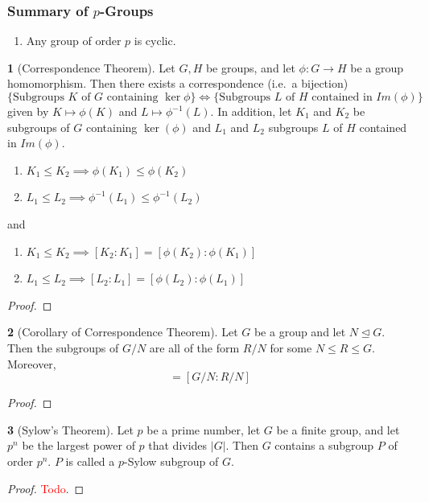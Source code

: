 \documentclass[12pt]{article}
\theoremstyle{definition}
\newtheorem{theorem}{\color{ForestGreen}{\textbf{Theorem}}}
\theoremstyle{definition}
\begin{document}
\subsubsection*{Summary of $p$-Groups}
\begin{enumerate}
	\item Any group of order $p$ is cyclic.
\end{enumerate}

\begin{theorem}[Correspondence Theorem]
	Let $G, H$ be groups, and let $\phi : G \to H$ be a group homomorphism. Then there exists a correspondence (i.e.\ a bijection)
	\begin{equation*}
		\{\text{Subgroups $K$ of $G$ containing $\ker \phi$}\} \iff \{\text{Subgroups $L$ of $H$ contained in $Im(\phi)$}\}
	\end{equation*}
	given by $K \mapsto \phi(K)$ and $L \mapsto \phi^{-1}(L)$. In addition, let $K_1$ and $K_2$ be subgroups of $G$ containing $\ker(\phi)$ and $L_1$ and $L_2$ subgroups $L$ of $H$ contained in $Im(\phi)$. 
	\begin{enumerate}
		\item $K_1 \leq K_2 \implies \phi(K_1) \leq \phi(K_2)$
		\item $L_1 \leq L_2 \implies \phi^{-1}(L_1) \leq \phi^{-1}(L_2)$
	\end{enumerate}
	and
	\begin{enumerate}
		\item $K_1 \leq K_2 \implies [K_2 : K_1] = [\phi(K_2) : \phi(K_1)]$
		\item $L_1 \leq L_2 \implies [L_2 : L_1] = [\phi(L_2) : \phi(L_1)]$
	\end{enumerate}
\end{theorem}
\begin{proof}

\end{proof}

\begin{theorem}[Corollary of Correspondence Theorem]
	Let $G$ be a group and let $N \trianglelefteq G$. Then the subgroups of $G/N$ are all of the form $R/N$ for some $N\leq R\leq G$. Moreover,
	\begin{equation}
		[G:R] = [G/N:R/N]
	\end{equation}
\end{theorem}
\begin{proof}

\end{proof}

\begin{theorem}[Sylow's Theorem]
	Let $p$ be a prime number, let $G$ be a finite group, and let $p^n$ be the largest power of $p$ that divides $
	|G|$. Then $G$ contains a subgroup $P$ of order $p^n$. $P$ is called a $p$-Sylow subgroup of $G$. 
\end{theorem}
\begin{proof}
	\textcolor{red}{Todo}.
\end{proof}
\end{document}
